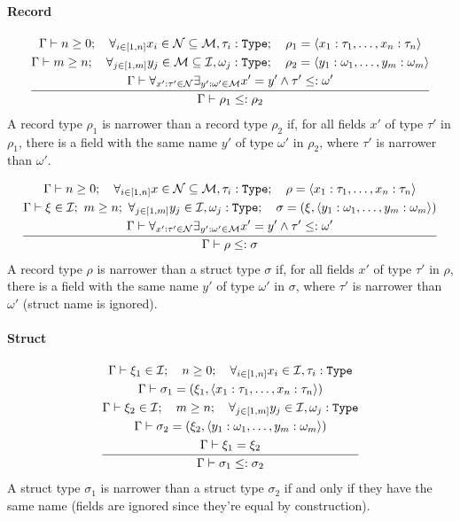 \vspace{\baselineskip}

\clearpage

\paragraph{Record}

\[
	\frac{\begin{gathered}
		\Gamma\vdash n \geq 0 ;\quad \forall_{i\in[1,n]}{x_i \in \mathcal{N} \subseteq \mathcal{M}, \tau_i:\texttt{Type}} ;\quad \rho_1 = \left<x_1:\tau_1,\dotsc,x_n:\tau_n\right> \\*
		\Gamma\vdash m \geq n ;\quad \forall_{j\in[1,m]}{y_j \in \mathcal{M} \subseteq \mathcal{I}, \omega_j:\texttt{Type}} ;\quad \rho_2 = \left<y_1:\omega_1,\dotsc,y_m:\omega_m\right> \\*
		\Gamma\vdash \forall_{x':\tau'\in\mathcal{N}}{\exists_{y':\omega'\in\mathcal{M}}{x'=y' \land \tau' \leq: \omega'}}
	\end{gathered}}{\begin{gathered}
		\Gamma\vdash \rho_1 \leq: \rho_2
	\end{gathered}}
\]
A record type $\rho_1$ is narrower than a record type $\rho_2$ if, for all
fields $x'$ of type $\tau'$ in $\rho_1$, there is a field with the same name
$y'$ of type $\omega'$ in $\rho_2$, where $\tau'$ is narrower than $\omega'$.

\vspace{\baselineskip}

\[
	\frac{\begin{gathered}
		\Gamma\vdash n \geq 0 ;\quad \forall_{i\in[1,n]}{x \in \mathcal{N} \subseteq \mathcal{M}, \tau_i:\texttt{Type}} ;\quad \rho = \left<x_1:\tau_1,\dotsc,x_n:\tau_n\right> \\*
		\Gamma\vdash \xi \in \mathcal{I} ;\  m \geq n ;\  \forall_{j\in[1,m]}{y_j \in \mathcal{I}, \omega_j:\texttt{Type}} ;\quad \sigma = (\xi, \left<y_1:\omega_1,\dotsc,y_m:\omega_m\right>) \\*
		\Gamma\vdash \forall_{x':\tau'\in\mathcal{N}}{\exists_{y':\omega'\in\mathcal{M}}{x'=y' \land \tau' \leq: \omega'}}
	\end{gathered}}{\begin{gathered}
		\Gamma\vdash \rho \leq: \sigma
	\end{gathered}}
\]
A record type $\rho$ is narrower than a struct type $\sigma$ if, for all fields
$x'$ of type $\tau'$ in $\rho$, there is a field with the same name $y'$ of
type $\omega'$ in $\sigma$, where $\tau'$ is narrower than $\omega'$ (struct
name is ignored).

\paragraph{Struct}

\[
	\frac{\begin{gathered}
		\Gamma\vdash \xi_1 \in \mathcal{I} ;\quad n \geq 0 ;\quad \forall_{i\in[1,n]}{x_i \in \mathcal{I}, \tau_i:\texttt{Type}} \\*
		\Gamma\vdash \sigma_1 = (\xi_1, \left<x_1:\tau_1,\dotsc,x_n:\tau_n\right>) \\*
		\Gamma\vdash \xi_2 \in \mathcal{I} ;\quad m \geq n ;\quad \forall_{j\in[1,m]}{y_j \in \mathcal{I}, \omega_j:\texttt{Type}} \\*
		\Gamma\vdash \sigma_2 = (\xi_2, \left<y_1:\omega_1,\dotsc,y_m:\omega_m\right>) \\*
		\Gamma\vdash \xi_1 = \xi_2
	\end{gathered}}{\begin{gathered}
		\Gamma\vdash \sigma_1 \leq: \sigma_2
	\end{gathered}}
\]
A struct type $\sigma_1$ is narrower than a struct type $\sigma_2$ if and only
if they have the same name (fields are ignored since they're equal by
construction).


